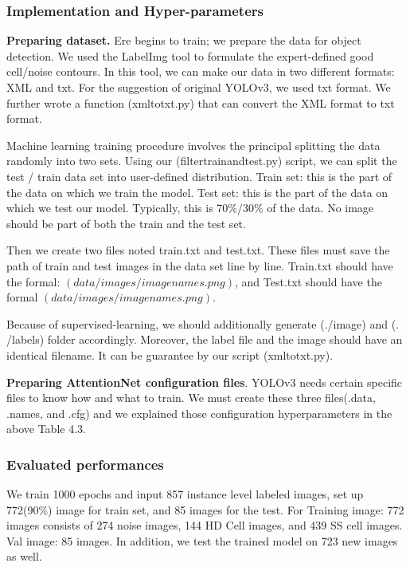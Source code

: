 \subsubsection{Implementation and Hyper-parameters}

\textbf{Preparing dataset.}  Ere begins to train; we prepare the data for object detection. We used the LabelImg tool to formulate the expert-defined good cell/noise contours. In this tool, we can make our data in two different formats: XML and txt. For the suggestion of original YOLOv3\cite{33}, we used txt format. We further wrote a function (xmltotxt.py) that can convert the XML format to txt format. 

Machine learning training procedure involves the principal splitting the data randomly into two sets. Using our (filtertrainandtest.py) script, we can split the test / train data set into user-defined distribution. Train set: this is the part of the data on which we train the model. Test set: this is the part of the data on which we test our model. Typically, this is 70\%/30\% of the data. No image should be part of both the train and the test set.

Then we create two files noted train.txt and test.txt. These files must save the path of train and test images in the data set line by line. Train.txt should have the formal: $(data/images/imagenames.png)$, and Test.txt should have the formal $(data/images/imagenames.png)$.

Because of supervised-learning, we should additionally generate (./image) and (. /labels) folder accordingly. Moreover, the label file and the image should have an identical filename. It can be guarantee by our script (xmltotxt.py).

\textbf{Preparing AttentionNet configuration files}. YOLOv3 \cite{33} needs certain specific files to know how and what to train. We must create these three files(.data, .names, and .cfg) and we explained those configuration hyperparameters in the above Table 4.3.\\



\subsubsection{Evaluated performances}
We train 1000 epochs and input 857 instance level labeled images, set up 772(90\%) image for train set, and 85 images for the test. For Training image: 772 images consists of 274 noise images, 144 HD Cell images, and 439 SS cell images. Val image: 85 images. In addition, we test the trained model on 723 new images as well.


